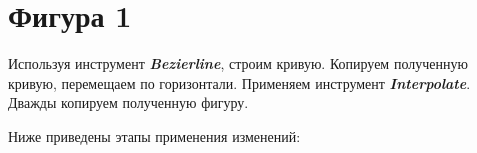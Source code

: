 \section[Фигура 1]{Фигура 1}
Используя инструмент \textbf{\textit{Bezierline}}, строим кривую.
Копируем полученную кривую, перемещаем по горизонтали.
Применяем инструмент \textbf{\textit{Interpolate}}.
Дважды копируем полученную фигуру.
\vspace{12pt}

Ниже приведены этапы применения изменений:
\hspace{0pt}
\begin{figure}[H]
    \begin{minipage}[h]{1\linewidth}
    \end{minipage}
\end{figure}
